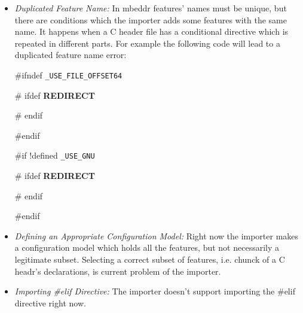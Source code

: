 \documentclass[titlepage]{article}
\begin{document}
\begin{itemize}
\item \emph{Duplicated Feature Name:} In mbeddr features' names must be unique, but there are conditions which the importer adds some features with the same name. It happens when a C header file has a conditional directive which is repeated in different parts. For example the following code will lead to a duplicated feature name error:

\#ifndef \texttt{\_USE\_FILE\_OFFSET64}

\hspace{20pt}\# ifdef \textbf{REDIRECT}
	
\hspace{20pt}\# endif
	
\#endif

\#if !defined \texttt{\_USE\_GNU}

\hspace{20pt}\# ifdef \textbf{REDIRECT}
	
\hspace{20pt}\# endif
	
\#endif



\item \emph{Defining an Appropriate Configuration Model:} Right now the importer makes a configuration model which holds all the features, but not necessarily a legitimate subset. Selecting a correct subset of features, i.e. chunck of a C headr's declarations, is current problem of the importer.

\item \emph{Importing \#elif Directive:} The importer doesn't support importing the \#elif directive right now.
\end{itemize}
\end{document}
